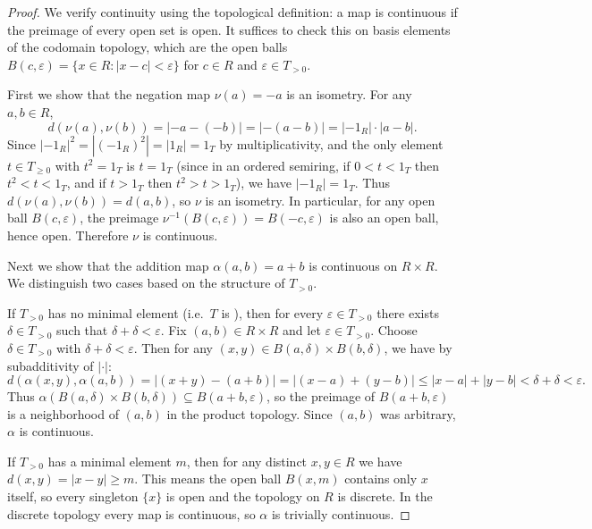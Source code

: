 \begin{proof}
    We verify continuity using the topological definition: a map is continuous if the preimage of every open set is open. It suffices to check this on basis elements of the codomain topology, which are the open balls $B(c, \varepsilon) = \{x \in R : |x - c| < \varepsilon\}$ for $c \in R$ and $\varepsilon \in T_{>0}$.

    First we show that the negation map $\nu(a) = -a$ is an isometry. For any $a, b \in R$,
    $$d(\nu(a), \nu(b)) = |-a - (-b)| = |-(a - b)| = |-1_R| \cdot |a - b|.$$
    Since $|-1_R|^2 = |(-1_R)^2| = |1_R| = 1_T$ by multiplicativity, and the only element $t \in T_{\geq 0}$ with $t^2 = 1_T$ is $t = 1_T$ (since in an ordered semiring, if $0 < t < 1_T$ then $t^2 < t < 1_T$, and if $t > 1_T$ then $t^2 > t > 1_T$), we have $|-1_R| = 1_T$. Thus $d(\nu(a), \nu(b)) = d(a,b)$, so $\nu$ is an isometry. In particular, for any open ball $B(c, \varepsilon)$, the preimage $\nu^{-1}(B(c, \varepsilon)) = B(-c, \varepsilon)$ is also an open ball, hence open. Therefore $\nu$ is continuous.

    Next we show that the addition map $\alpha(a,b) = a + b$ is continuous on $R \times R$. We distinguish two cases based on the structure of $T_{>0}$.

    If $T_{>0}$ has no minimal element (i.e.\ $T$ is ), then for every $\varepsilon \in T_{>0}$ there exists $\delta \in T_{>0}$ such that $\delta + \delta < \varepsilon$. Fix $(a,b) \in R \times R$ and let $\varepsilon \in T_{>0}$. Choose $\delta \in T_{>0}$ with $\delta + \delta < \varepsilon$. Then for any $(x,y) \in B(a, \delta) \times B(b, \delta)$, we have by subadditivity of $|\cdot|$:
    $$d(\alpha(x,y), \alpha(a,b)) = |(x+y) - (a+b)| = |(x-a) + (y-b)| \leq |x-a| + |y-b| < \delta + \delta < \varepsilon.$$
    Thus $\alpha(B(a, \delta) \times B(b, \delta)) \subseteq B(a+b, \varepsilon)$, so the preimage of $B(a+b, \varepsilon)$ is a neighborhood of $(a,b)$ in the product topology. Since $(a,b)$ was arbitrary, $\alpha$ is continuous.

    If $T_{>0}$ has a minimal element $m$, then for any distinct $x, y \in R$ we have $d(x,y) = |x-y| \geq m$. This means the open ball $B(x, m)$ contains only $x$ itself, so every singleton $\{x\}$ is open and the topology on $R$ is discrete. In the discrete topology every map is continuous, so $\alpha$ is trivially continuous.


\end{proof}
